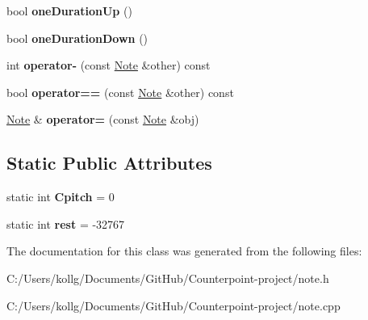 \begin{DoxyCompactItemize}
\item 
\hypertarget{class_note_a0f3c3cb7c09184974f9ffc43ae172e05}{}bool {\bfseries one\+Duration\+Up} ()\label{class_note_a0f3c3cb7c09184974f9ffc43ae172e05}

\item 
\hypertarget{class_note_a5ddfcb73da1e0690f7c1a9f0ceacd443}{}bool {\bfseries one\+Duration\+Down} ()\label{class_note_a5ddfcb73da1e0690f7c1a9f0ceacd443}

\item 
\hypertarget{class_note_a3f3527e444b1155ce16cbbaef24bcf91}{}int {\bfseries operator-\/} (const \hyperlink{class_note}{Note} \&other) const \label{class_note_a3f3527e444b1155ce16cbbaef24bcf91}

\item 
\hypertarget{class_note_a984fa9cde034c65bb365d2cd62b80652}{}bool {\bfseries operator==} (const \hyperlink{class_note}{Note} \&other) const \label{class_note_a984fa9cde034c65bb365d2cd62b80652}

\item 
\hypertarget{class_note_a095170ee6baa08ce011b914e630055b9}{}\hyperlink{class_note}{Note} \& {\bfseries operator=} (const \hyperlink{class_note}{Note} \&obj)\label{class_note_a095170ee6baa08ce011b914e630055b9}

\end{DoxyCompactItemize}
\subsection*{Static Public Attributes}
\begin{DoxyCompactItemize}
\item 
\hypertarget{class_note_ab43719e2af6ebfefb262d23b78f240ff}{}static int {\bfseries Cpitch} = 0\label{class_note_ab43719e2af6ebfefb262d23b78f240ff}

\item 
\hypertarget{class_note_a83b316633a96283960c3c58479a18a76}{}static int {\bfseries rest} = -\/32767\label{class_note_a83b316633a96283960c3c58479a18a76}

\end{DoxyCompactItemize}


The documentation for this class was generated from the following files\+:\begin{DoxyCompactItemize}
\item 
C\+:/\+Users/kollg/\+Documents/\+Git\+Hub/\+Counterpoint-\/project/note.\+h\item 
C\+:/\+Users/kollg/\+Documents/\+Git\+Hub/\+Counterpoint-\/project/note.\+cpp\end{DoxyCompactItemize}
